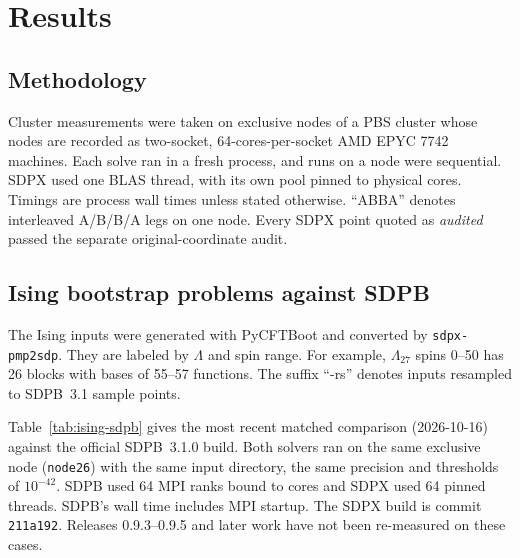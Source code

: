 \documentclass[11pt]{article}
\newcommand{\code}[1]{\texttt{#1}}
\begin{document}
\section{Results}
\label{sec:results}

\subsection{Methodology}

Cluster measurements were taken on exclusive nodes of a PBS cluster whose
nodes are recorded as two-socket, 64-cores-per-socket AMD EPYC 7742 machines.
Each solve ran in a fresh process, and runs on a node were sequential. SDPX
used one BLAS thread, with its own pool pinned to physical cores. Timings
are process wall times unless stated otherwise. ``ABBA'' denotes interleaved
A/B/B/A legs on one node. Every SDPX point quoted as \emph{audited} passed the
separate original-coordinate audit.

\subsection{Ising bootstrap problems against SDPB}

The Ising inputs were generated with PyCFTBoot and converted by
\code{sdpx-pmp2sdp}. They are labeled by $\Lambda$ and spin range. For example,
$\Lambda_{27}$ spins 0--50 has 26 blocks with bases of 55--57 functions.
The suffix ``-rs'' denotes inputs resampled to SDPB~3.1 sample points.

Table~\ref{tab:ising-sdpb} gives the most recent matched comparison
(2026-10-16) against the official SDPB~3.1.0 build. Both solvers ran on the
same exclusive node (\code{node26}) with the same input directory, the same
precision and thresholds of $10^{-42}$. SDPB used 64 MPI ranks bound to cores
and SDPX used 64 pinned threads. SDPB's wall time includes MPI startup. The
SDPX build is commit \code{211a192}. Releases 0.9.3--0.9.5 and later work have
not been re-measured on these cases.
\end{document}
